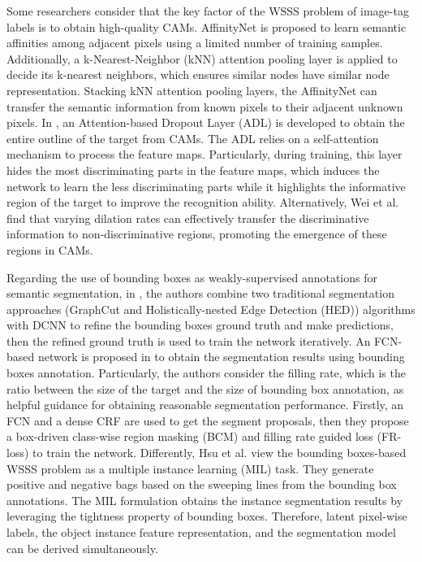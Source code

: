 \documentclass[journal]{IEEEtran}
\begin{document}
Some researchers consider that the key factor of the WSSS problem of image-tag labels is to obtain high-quality CAMs. AffinityNet \cite{ma2019affinitynet} is proposed to learn semantic affinities among adjacent pixels using a limited number of training samples. Additionally, a k-Nearest-Neighbor (kNN) attention pooling layer is applied to decide its k-nearest neighbors, which ensures similar nodes have similar node representation. Stacking kNN attention pooling layers, the AffinityNet can transfer the semantic information from known pixels to their adjacent unknown pixels. In \cite{choe2019attention}, an Attention-based Dropout Layer (ADL) is developed to obtain the entire outline of the target from CAMs. The ADL relies on a self-attention mechanism to process the feature maps. Particularly, during training, this layer hides the most discriminating parts in the feature maps, which induces the network to learn the less discriminating parts while it highlights the informative region of the target to improve the recognition ability. Alternatively, Wei et al. \cite{wei2018revisiting} find that varying dilation rates can effectively transfer the discriminative information to non-discriminative regions, promoting the emergence of these regions in CAMs. 

Regarding the use of bounding boxes as weakly-supervised annotations for semantic segmentation, in \cite{khoreva2017simple}, the authors combine two traditional segmentation approaches (GraphCut and Holistically-nested Edge Detection (HED)) algorithms with DCNN to refine the bounding boxes ground truth and make predictions, then the refined ground truth is used to train the network iteratively. An FCN-based network is proposed in \cite{song2019box} to obtain the segmentation results using bounding boxes annotation. Particularly, the authors consider the filling rate, which is the ratio between the size of the target and the size of bounding box annotation, as helpful guidance for obtaining reasonable segmentation performance. Firstly, an FCN and a dense CRF \cite{krahenbuhl2011efficient} are used to get the segment proposals, then they propose a box-driven class-wise region masking (BCM) and filling rate guided loss (FR-loss) to train the network. Differently, Hsu et al. \cite{hsu2019weakly} view the bounding boxes-based WSSS problem as a multiple instance learning (MIL) task. They generate positive and negative bags based on the sweeping lines from the bounding box annotations. The MIL formulation obtains the instance segmentation results by leveraging the tightness property of bounding boxes. Therefore, latent pixel-wise labels, the object instance feature representation, and the segmentation model can be derived simultaneously. 
\end{document}
